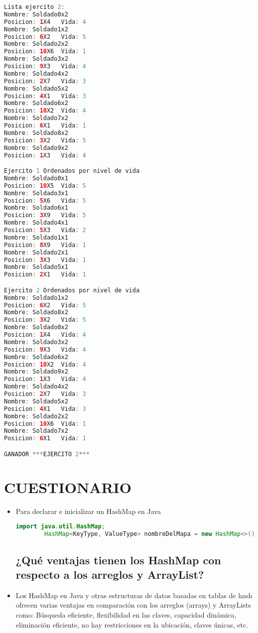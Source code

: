 \documentclass{article}
\begin{document}
\begin{itemize}
\begin{itemize}
\begin{lstlisting}[language=java]
Lista ejercito 2:
Nombre: Soldado0x2
Posicion: 1X4   Vida: 4
Nombre: Soldado1x2
Posicion: 6X2   Vida: 5
Nombre: Soldado2x2
Posicion: 10X6  Vida: 1
Nombre: Soldado3x2
Posicion: 9X3   Vida: 4
Nombre: Soldado4x2
Posicion: 2X7   Vida: 3
Nombre: Soldado5x2
Posicion: 4X1   Vida: 3
Nombre: Soldado6x2
Posicion: 10X2  Vida: 4
Nombre: Soldado7x2
Posicion: 6X1   Vida: 1
Nombre: Soldado8x2
Posicion: 3X2   Vida: 5
Nombre: Soldado9x2
Posicion: 1X3   Vida: 4

Ejercito 1 Ordenados por nivel de vida
Nombre: Soldado0x1
Posicion: 10X5  Vida: 5
Nombre: Soldado3x1
Posicion: 5X6   Vida: 5
Nombre: Soldado6x1
Posicion: 3X9   Vida: 5
Nombre: Soldado4x1
Posicion: 5X3   Vida: 2
Nombre: Soldado1x1
Posicion: 8X9   Vida: 1
Nombre: Soldado2x1
Posicion: 3X3   Vida: 1
Nombre: Soldado5x1
Posicion: 2X1   Vida: 1

Ejercito 2 Ordenados por nivel de vida
Nombre: Soldado1x2
Posicion: 6X2   Vida: 5
Nombre: Soldado8x2
Posicion: 3X2   Vida: 5
Nombre: Soldado0x2
Posicion: 1X4   Vida: 4
Nombre: Soldado3x2
Posicion: 9X3   Vida: 4
Nombre: Soldado6x2
Posicion: 10X2  Vida: 4
Nombre: Soldado9x2
Posicion: 1X3   Vida: 4
Nombre: Soldado4x2
Posicion: 2X7   Vida: 3
Nombre: Soldado5x2
Posicion: 4X1   Vida: 3
Nombre: Soldado2x2
Posicion: 10X6  Vida: 1
Nombre: Soldado7x2
Posicion: 6X1   Vida: 1

GANADOR ***EJERCITO 2***
         \end{lstlisting}
 
    \section{CUESTIONARIO}

	\begin{itemize}
	\subsection {¿Cómo se declara e inicializa un HashMap?}
        \item Para declarar e inicializar un HashMap en Java
        \begin{lstlisting}[language=java]
        import java.util.HashMap;
        HashMap<KeyType, ValueType> nombreDelMapa = new HashMap<>();
        \end{lstlisting}
		
    \subsection {¿Qué ventajas tienen los HashMap con respecto a los arreglos y ArrayList?}
        \item Los HashMap en Java y otras estructuras de datos basadas en tablas de hash ofrecen varias ventajas en comparación con los arreglos (arrays) y ArrayLists como: Búsqueda eficiente, flexibilidad en las claves, capacidad dinámica, eliminación eficiente, no hay restricciones en la ubicación, claves únicas, etc.


\end{itemize}
\end{itemize}
\end{itemize}
\end{document}
